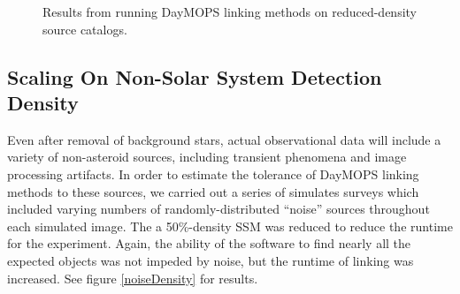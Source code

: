 \documentclass[12pt,preprint]{aastex}
\begin{document}
\begin{figure}

\caption{ Results from running DayMOPS linking methods on reduced-density source catalogs. }

\label{ssmDensity}

\end{figure}














\subsection{Scaling On Non-Solar System Detection Density}

Even after removal of background stars, actual observational data will
include a variety of non-asteroid sources, including transient
phenomena and image processing artifacts.  In order to estimate the
tolerance of DayMOPS linking methods to these sources, we carried out
a series of simulates surveys which included varying numbers of
randomly-distributed ``noise'' sources throughout each simulated
image.  The a 50\%-density SSM was reduced to reduce the runtime for
the experiment.  Again, the ability of the software to find nearly all
the expected objects was not impeded by noise, but the runtime of linking
was increased.  See figure \ref{noiseDensity} for results.
\end{document}
